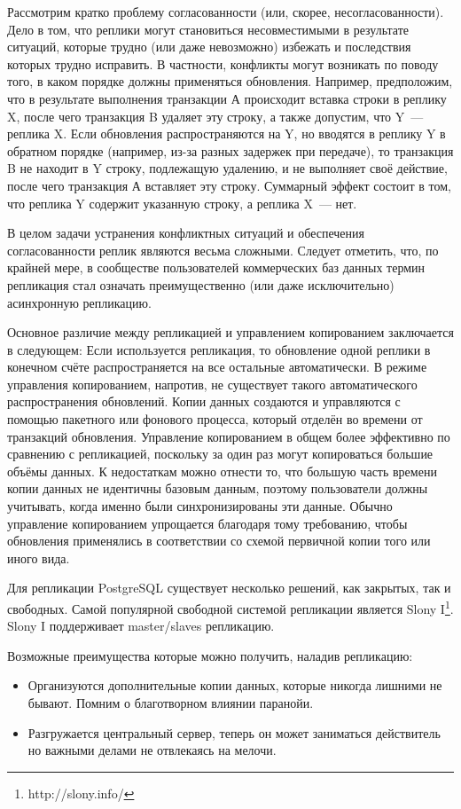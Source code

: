 Рассмотрим кратко проблему согласованности (или, скорее, несогласованности). 
Дело в том, что реплики могут становиться несовместимыми в результате ситуаций, которые трудно (или даже 
невозможно) избежать и последствия которых трудно исправить.
В частности, конфликты могут возникать по поводу того, в каком порядке должны применяться обновления. 
Например, предположим, что в результате выполнения транзакции А происходит вставка строки в реплику X, 
после чего транзакция B удаляет эту строку, а также допустим, что Y~--- реплика X. Если обновления распространяются на Y, 
но вводятся в реплику Y в обратном порядке (например, из-за разных задержек при передаче), то транзакция B не находит в Y 
строку, подлежащую удалению, и не выполняет своё действие, после чего транзакция А вставляет эту строку. Суммарный эффект 
состоит в том, что реплика Y содержит указанную строку, а реплика X~--- нет.

В целом задачи устранения конфликтных ситуаций и обеспечения согласованности реплик являются весьма сложными. 
Следует отметить, что, по крайней мере, в сообществе пользователей коммерческих баз данных термин репликация стал означать 
преимущественно (или даже исключительно) асинхронную репликацию.

Основное различие между репликацией и управлением копированием заключается в следующем:
Если используется репликация, то обновление одной реплики в конечном счёте распространяется на все остальные автоматически.
В режиме управления копированием, напротив, не существует такого автоматического распространения обновлений. 
Копии данных создаются и управляются с помощью пакетного или фонового процесса, который отделён во времени от транзакций обновления.
Управление копированием в общем более эффективно по сравнению с репликацией, поскольку за один раз могут копироваться 
большие объёмы данных. К недостаткам можно отнести то, что большую часть времени копии данных не идентичны базовым данным, 
поэтому пользователи должны учитывать, когда именно были синхронизированы эти данные.
Обычно управление копированием упрощается благодаря тому требованию, чтобы обновления применялись в соответствии со 
схемой первичной копии того или иного вида.

Для репликации PostgreSQL существует несколько решений, как закрытых, так и свободных. Самой популярной свободной системой 
репликации является Slony I\footnote{http://slony.info/}. Slony I поддерживает master/slaves репликацию. 

Возможные преимущества которые можно получить, наладив репликацию: 
\begin{itemize}
\item Организуются дополнительные копии данных, которые никогда лишними не бывают. Помним о благотворном влиянии паранойи.
\item Разгружается центральный сервер, теперь он может заниматься действитель но важными делами не отвлекаясь на мелочи. 
\end{itemize}

